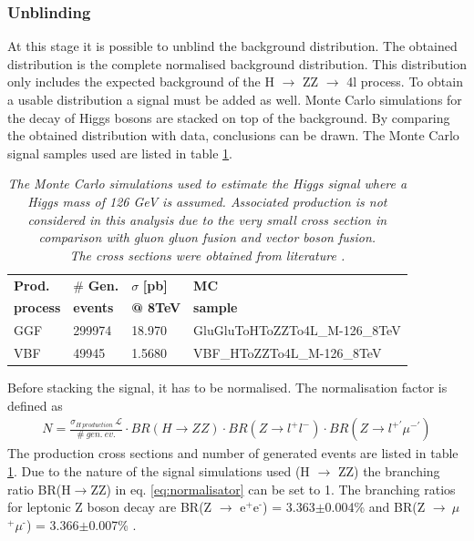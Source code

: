 \documentclass[a4paper,12pt]{article}
\newcommand{\superscript}[1]{\ensuremath{^{\textrm{#1}}}}
\begin{document}
\subsubsection{Unblinding}
At this stage it is possible to unblind the background distribution. The obtained distribution is the complete normalised background distribution. This distribution only includes the expected background of the H $\rightarrow$ ZZ $\rightarrow$ 4l process. To obtain a usable distribution a signal must be added as well. Monte Carlo simulations for the decay of Higgs bosons are stacked on top of the background. By comparing the obtained distribution with data, conclusions can be drawn. The Monte Carlo signal samples used are listed in table \ref{table:higgs1}.
\begin{table}[H]
	\begin{tabular}{l | l l  | l }
		\textbf{Prod.}  
		& \boldmath$\#$ \textbf{Gen.}	
		& \boldmath$\sigma$ \textbf{[pb]}	
		& \textbf{MC}\\
		
		\textbf{process}
		&\textbf{events}
		&\textbf{@ 8TeV}
		&\textbf{sample}\\
		\hline
		GGF				& 299974		& 18.970		 	& GluGluToHToZZTo4L\_M-126\_8TeV\\
		VBF				& 49945			& 1.5680		 	& VBF\_HToZZTo4L\_M-126\_8TeV\\
	\end{tabular}
	\caption{\emph{The Monte Carlo simulations used to estimate the Higgs signal where a Higgs mass of 126 GeV is assumed. Associated production is not considered in this analysis due to the very small cross section in comparison with gluon gluon fusion and vector boson fusion.
	\\The cross sections were obtained from literature \cite{two}.}}
	\label{table:higgs1}
\end{table}
Before stacking the signal, it has to be normalised. The normalisation factor is defined as
\begin{eqnarray}
	N = \frac{\sigma_{H\ production}\ \mathcal{L}}{\#\ gen.\ ev.}\cdot BR(H\rightarrow ZZ) \cdot BR(Z\rightarrow l^+ l^-) \cdot BR(Z\rightarrow l^{+ '}  \mu^{- '}) \nonumber
	\label{eq:normalisator}
\end{eqnarray}
The production cross sections and number of generated events are listed in table \ref{table:higgs1}. Due to the nature of the signal simulations used (H $\rightarrow$ ZZ) the branching ratio BR(H$\rightarrow$ZZ) in eq. \ref{eq:normalisator} can be set to 1. The branching ratios for leptonic Z boson decay are BR(Z $\rightarrow$ e\superscript{+}e\superscript{-}) = 3.363$\pm$0.004\% and BR(Z $\rightarrow\ \mu$\superscript{+}$\mu$\superscript{-}) = 3.366$\pm$0.007\% \cite{three}.
\end{document}
